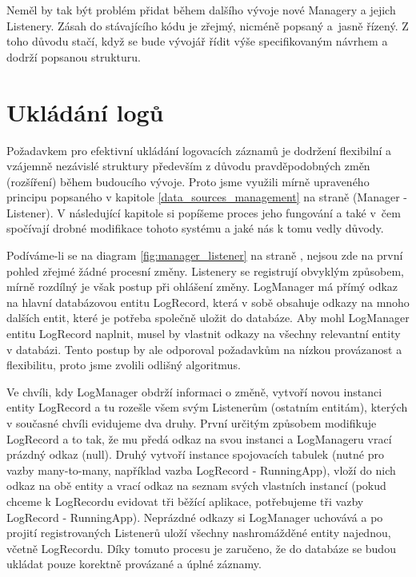 \documentclass[thesis=M,czech]{FITthesis}[2012/06/26]
\begin{document}
Neměl by tak být problém přidat během dalšího vývoje nové Managery a jejich Listenery. Zásah do stávajícího kódu je zřejmý, nicméně popsaný a~jasně řízený. Z toho důvodu stačí, když se bude vývojář řídit výše specifikovaným návrhem a dodrží popsanou strukturu.

\section{Ukládání logů}
Požadavkem pro efektivní ukládání logovacích záznamů je dodržení flexibilní a vzájemně nezávislé struktury především z důvodu pravděpodobných změn (rozšíření) během budoucího vývoje. Proto jsme využili mírně upraveného principu popsaného v kapitole \ref{data_sources_management} na straně \pageref{data_sources_management} (Manager - Listener). V následující kapitole si popíšeme proces jeho fungování a také v~čem spočívají drobné modifikace tohoto systému a jaké nás k tomu vedly důvody.

Podíváme-li se na diagram \ref{fig:manager_listener} na straně \pageref{fig:manager_listener}, nejsou zde na první pohled zřejmé žádné procesní změny. Listenery se registrují obvyklým způsobem, mírně rozdílný je však postup při ohlášení změny. LogManager má přímý odkaz na hlavní databázovou entitu LogRecord, která v sobě obsahuje odkazy na mnoho dalších entit, které je potřeba společně uložit do databáze. Aby mohl LogManager entitu LogRecord naplnit, musel by vlastnit odkazy na všechny relevantní entity v databázi. Tento postup by ale odporoval požadavkům na nízkou provázanost a flexibilitu, proto jsme zvolili odlišný algoritmus.

Ve chvíli, kdy LogManager obdrží informaci o změně, vytvoří novou instanci entity LogRecord a tu rozešle všem svým Listenerům (ostatním entitám), kterých v současné chvíli evidujeme dva druhy. První určitým způsobem modifikuje LogRecord a to tak, že mu předá odkaz na svou instanci a LogManageru vrací prázdný odkaz (null). Druhý vytvoří instance spojovacích tabulek (nutné pro vazby many-to-many, například vazba LogRecord - RunningApp), vloží do nich odkaz na obě entity a vrací odkaz na seznam svých vlastních instancí (pokud chceme k LogRecordu evidovat tři běžící aplikace, potřebujeme tři vazby LogRecord - RunningApp). Neprázdné odkazy si LogManager uchovává a po projití registrovaných Listenerů uloží všechny nashromážděné entity najednou, včetně LogRecordu. Díky tomuto procesu je zaručeno, že do databáze se budou ukládat pouze korektně provázané a úplné záznamy.
\end{document}
